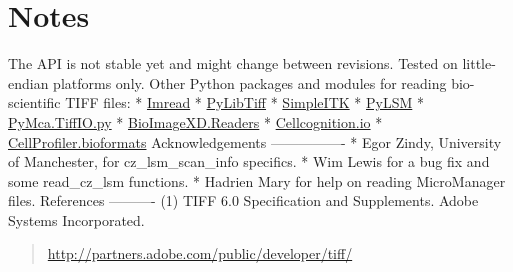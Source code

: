 \documentclass[letterpaper,10pt,english]{sphinxmanual}
\begin{document}
\section{Notes}
\label{tifffile:notes}
The API is not stable yet and might change between revisions.
Tested on little-endian platforms only.
Other Python packages and modules for reading bio-scientific TIFF files:
* \href{http://luispedro.org/software/imread}{Imread}
* \href{http://code.google.com/p/pylibtiff}{PyLibTiff}
* \href{http://www.simpleitk.org}{SimpleITK}
* \href{https://launchpad.net/pylsm}{PyLSM}
* \href{http://pymca.sourceforge.net/}{PyMca.TiffIO.py}
* \href{http://www.bioimagexd.net/}{BioImageXD.Readers}
* \href{http://cellcognition.org/}{Cellcognition.io}
* \href{http://www.cellprofiler.org/}{CellProfiler.bioformats}
Acknowledgements
----------------
*  Egor Zindy, University of Manchester, for cz\_lsm\_scan\_info specifics.
*  Wim Lewis for a bug fix and some read\_cz\_lsm functions.
*  Hadrien Mary for help on reading MicroManager files.
References
----------
(1) TIFF 6.0 Specification and Supplements. Adobe Systems Incorporated.
\begin{quote}

\href{http://partners.adobe.com/public/developer/tiff/}{http://partners.adobe.com/public/developer/tiff/}
\end{quote}
\end{document}
